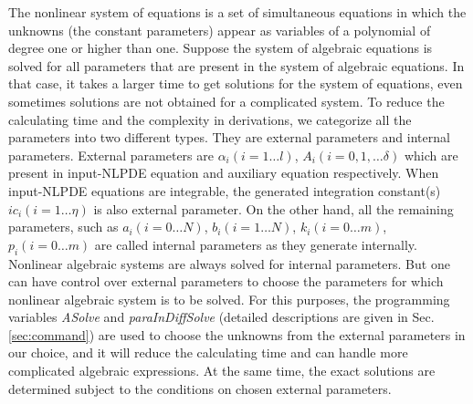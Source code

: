 \documentclass[prd,aps,floats,showkeys,nofootinbib,notitlepage]{revtex4-2}
\begin{document}
	The nonlinear system of equations is a set of simultaneous equations in which the unknowns (the constant parameters) appear as variables of a polynomial of degree one or higher than one.
	Suppose the system of algebraic equations is solved for all parameters that are present in the system of algebraic equations. In that case, it takes a larger time to get solutions for the system of equations, even sometimes solutions are not obtained for a complicated system. To reduce the calculating time and the complexity in derivations, we categorize all the parameters into two different types. They are external parameters and internal parameters. External parameters are $\alpha_i(i=1\ldots l)$, $A_i(i=0,1,\ldots \delta)$ which are present in input-NLPDE equation and auxiliary equation respectively. When input-NLPDE equations are integrable, the generated integration constant(s) $ic_i(i=1\ldots \eta)$ is also external parameter. On the other hand, all the remaining parameters, such as $a_i(i=0\ldots N)$, $b_i(i=1\ldots N)$, $k_i(i=0\ldots m)$, $p_i(i=0\ldots m)$ are called internal parameters as they generate internally. Nonlinear algebraic systems are always solved for internal parameters. But one can have control over external parameters to choose the parameters for which nonlinear algebraic system is to be solved. For this purposes, the programming variables {\em ASolve} and {\em paraInDiffSolve} (detailed descriptions are given in Sec. \ref{sec:command}) are used to choose the unknowns from the external parameters in our choice, and it will reduce the calculating time and can handle more complicated algebraic expressions. At the same time, the exact solutions are determined subject to the conditions on chosen external parameters.    \\
	
\end{document}
